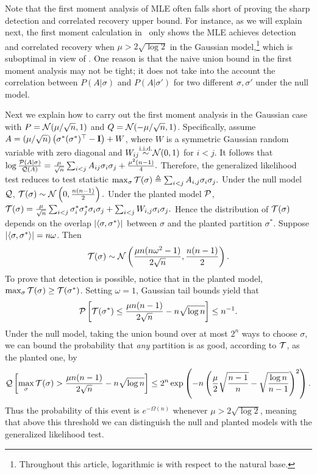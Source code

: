 Note that the first moment analysis of MLE often falls short of proving the sharp detection and correlated recovery upper bound. For instance, as we will explain next, the first moment calculation in~\cite[Theorem 2]{Banks16}
only shows the MLE achieves detection and correlated recovery when $\mu>2\sqrt{\log 2}$ in the Gaussian model,\footnote{Throughout this article, logarithmic is with respect to the natural base.} which is suboptimal in view of .
One reason is that the naive union bound in the first moment analysis may not
be tight; it does not take into the account the correlation between $P(A|\sigma)$ and $P(A|\sigma')$ for two different
$\sigma, \sigma'$ under the null model.

Next we explain how to carry out the first moment analysis in 
the Gaussian case with $P=\calN(\mu/\sqrt{n},1)$
and $Q=\calN( -\mu/\sqrt{n},1)$.
Specifically, assume $A= (\mu/\sqrt n)\left( \sigma^* (\sigma^*)^\top - \identity \right) +W$,
where  $W$ is a symmetric Gaussian random variable with zero diagonal and
$W_{ij} \iiddistr \calN(0,1)$ for $i<j$. It follows that 
$
	\log \frac{\P(A | \sigma)}{\Q(A)} = \frac{\mu}{\sqrt{n}} \sum_{i<j} A_{ij} \sigma_i \sigma_j + \frac{\mu^2 (n-1)}{4}.
$
Therefore, the generalized likelihood test reduces to test statistic 
$
	\max_{\sigma} \score(\sigma) \triangleq \sum_{i < j} A_{i,j} \sigma_i \sigma_j. 
$
Under the null model $\Q$, $
	\score(\sigma) \sim \calN\left(0, \frac{n (n-1) }{2} \right).$
Under the planted model $\P$, $
	\score(\sigma)  = \frac{\mu}{\sqrt{n} } \sum_{i<j} \sigma_i^* \sigma_j^* \sigma_i \sigma_j 
	 + \sum_{i < j} W_{i,j} \sigma_i \sigma_j.$
Hence the distribution of $\score(\sigma)$ depends on the overlap  $|\Iprod{\sigma}{\sigma^*}|$ 
between $\sigma$ and the planted partition $\sigma^*$. Suppose $|\Iprod{\sigma}{\sigma^*}|= n\omega$. Then 
\begin{align*}
	\score(\sigma) \sim \calN\left(\frac{\mu n ( n\omega^2-1) }{2 \sqrt n}  , \frac{n (n-1) }{2} \right).
\end{align*}
To prove that detection is possible, notice that in the planted model, 
$\max_\sigma \score(\sigma) \ge \score(\sigma^*)$.
Setting $\omega = 1$, Gaussian tail bounds yield that
\begin{align*}
	\P\left[\score(\sigma^*) \le \frac{\mu n(n-1) }{2 \sqrt n} -  n \sqrt{\log n} \right] \le n^{-1}.
\end{align*}
Under the null model,  taking the union bound over at most $2^n$ ways to choose $\sigma$, 
we can bound the probability that \emph{any} partition is as good, according to $\score$, as the planted one, by
\begin{align*}
	 \Q\left[\max_{\sigma}\score(\sigma) > \frac{\mu n(n-1) }{2 \sqrt n} -  n \sqrt{\log n} \right]   \le 
	 2^n \exp \left( 
	 - n \left( \frac{\mu}{2} \sqrt{\frac{n-1}{n}} - 
	\sqrt{\frac{\log n}{n-1} } \right)^2  \right) .
\end{align*}
%
Thus the probability of this event is $e^{-\Omega(n)}$ whenever $ \mu > 2 \sqrt{\log 2}$, 
meaning that above this threshold we can distinguish the null and planted models with 
the generalized likelihood test.

